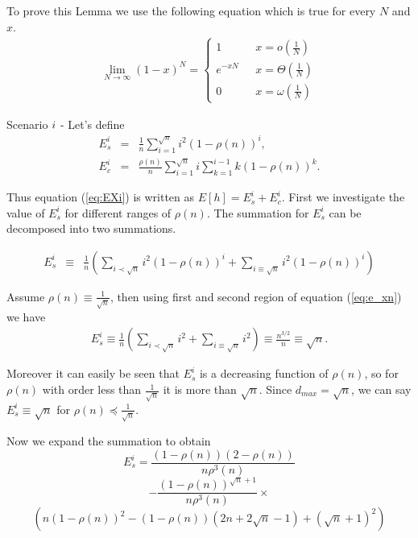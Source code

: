 \documentclass[journal]{IEEEtran}
\theoremstyle{plain}
\theoremstyle{remark}
\begin{document}
\begin{IEEEproof}
To prove this Lemma we use the following equation which is true for every $N$ and $x$.
\begin{eqnarray}
\lim_{N\rightarrow \infty} (1-x)^N=\left\{\begin{array}{ll}
					1& \ \ \  x=o(\frac{1}{N}) \\
					e^{-xN}& \ \ \  x=\Theta(\frac{1}{N}) \\
					0& \ \ \ x=\omega(\frac{1}{N})
		\end{array}\right . \label{eq:e_xn}
\end{eqnarray}

Scenario $\romannumeral 1$ - Let's define 
\begin{eqnarray}
E_s^i&=&\frac{1}{n}\sum_{i=1}^{\sqrt{n}} i^2(1-\rho(n))^i,  \\
E_c^i&=&\frac{\rho(n)}{n}\sum_{i=1}^{\sqrt{n}}i\sum_{k=1}^{i-1}k(1-\rho(n))^k.
\end{eqnarray}

Thus equation (\ref{eq:EXi}) is written as $E[h]=E_s^i+E_c^i$.
First we investigate the value of $E_s^i$ for different ranges of $\rho(n)$. The summation for $E_s^i$ can be decomposed into two  summations.

\begin{eqnarray}
E_s^i&\equiv& \frac{1}{n}(\sum_{i\prec \sqrt{n}}i^2(1-\rho(n))^i + \sum_{i\equiv \sqrt{n}}i^2(1-\rho(n))^i) 
\end{eqnarray}

Assume $\rho(n)\equiv \frac{1}{\sqrt{n}}$, then using first and second region of equation (\ref{eq:e_xn}) we have
\begin{eqnarray}
E_s^i\equiv \frac{1}{n}(\sum_{i\prec \sqrt{n}}i^2 + \sum_{i\equiv \sqrt{n}}i^2) \equiv \frac{n^{3/2}}{n} \equiv \sqrt{n}.
\end{eqnarray}

Moreover it can easily be seen that $E_s^i$ is a decreasing function of $\rho(n)$, so for $\rho(n)$ with order less than $\frac{1}{\sqrt{n}}$ it is more than $\sqrt{n}$. Since $d_{max}=\sqrt{n}$, we can say $E_s^i\equiv \sqrt{n}$ for $\rho(n) \preceq \frac{1}{\sqrt{n}}$.

Now we expand the summation to obtain 
\begin{equation}
E_s^i =\frac{(1-\rho(n))(2-\rho(n))}{n\rho^3(n)} \nonumber
\end{equation}
\begin{equation}
-\frac{(1-\rho(n))^{\sqrt{n}+1}}{n\rho^3(n)} \times \nonumber 
\end{equation}
\begin{equation}
(n(1-\rho(n))^2-(1-\rho(n))(2n+2\sqrt{n}-1)+(\sqrt{n}+1)^2)
\end{equation}


\end{IEEEproof}
\end{document}
